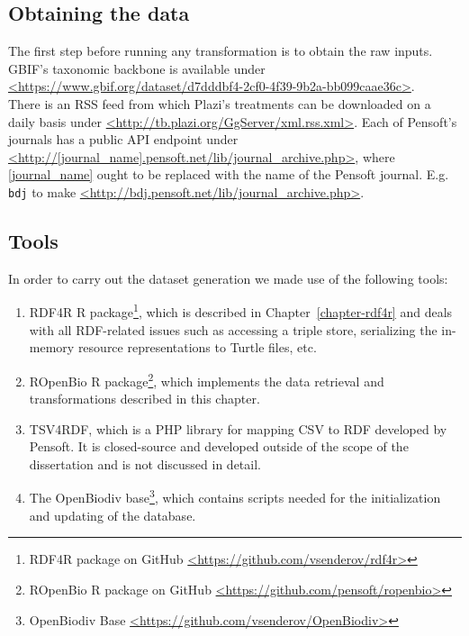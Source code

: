 \subsection{Obtaining the data}

The first step before running any transformation is to obtain the raw inputs. GBIF's taxonomic backbone is available under\\ 
\url{<https://www.gbif.org/dataset/d7dddbf4-2cf0-4f39-9b2a-bb099caae36c>}.\\There is an RSS feed from which Plazi's treatments can be downloaded on a daily basis under \url{<http://tb.plazi.org/GgServer/xml.rss.xml>}. Each of Pensoft's journals has a public API endpoint under \url{<http://[journal_name].pensoft.net/lib/journal_archive.php>}, where \url{[journal_name]} ought to be replaced with the name of the Pensoft journal. E.g. {\tt bdj} to make \url{<http://bdj.pensoft.net/lib/journal_archive.php>}.

\subsection{Tools}

In order to carry out the dataset generation we made use of the following tools:

\begin{enumerate}
\item{RDF4R R package\footnote{RDF4R package on GitHub \href{https://github.com/vsenderov/rdf4r}{\url{<https://github.com/vsenderov/rdf4r>}}}, which is described in Chapter~\ref{chapter-rdf4r} and deals with all RDF-related issues such as accessing a triple store, serializing the in-memory resource representations to Turtle files, etc.}
\item{ROpenBio R package\footnote{ROpenBio R package on GitHub \href{https://github.com/pensoft/ropenbio}{\url{<https://github.com/pensoft/ropenbio>}}}, which implements the data retrieval and transformations described in this chapter.}
\item{TSV4RDF, which is a PHP library for mapping CSV to RDF developed by Pensoft. It is closed-source and developed outside of the scope of the dissertation and is not discussed in detail.}
\item{The OpenBiodiv base\footnote{OpenBiodiv Base \href{https://github.com/vsenderov/OpenBiodiv}{\url{<https://github.com/vsenderov/OpenBiodiv>}}}, which contains scripts needed for the initialization and updating of the database.}
\end{enumerate}

